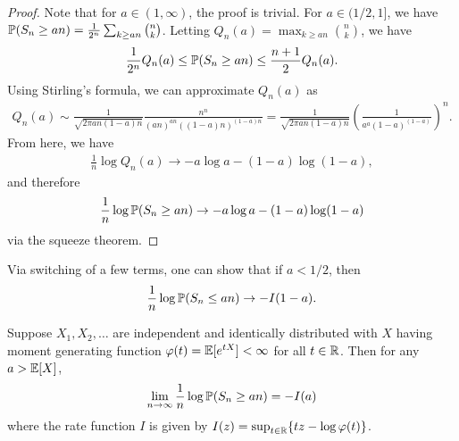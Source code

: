 \begin{proof}
    Note that for $a \in (1,\infty)$, the proof is trivial. For $a \in (1/2,1]$, we have $\mathbb{P}(S_{n} \geq an) = \frac{1}{2^{n}} \sum_{k \geq an} \binom{n}{k}$. Letting $Q_{n}(a) = \max_{k \geq an} \binom{n}{k}$, we have
    \begin{align}
        \frac{1}{2^{n}} Q_{n}(a) \leq \mathbb{P}(S_{n} \geq an) \leq \frac{n+1}{2} Q_{n}(a).
    \end{align}
    Using Stirling's formula, we can approximate $Q_{n}(a)$ as
    \begin{align}
        Q_{n}(a) \sim \frac{1}{\sqrt{2\pi an(1-a)n}} \frac{n^{n}}{(an)^{an}((1-a)n)^{(1-a)n}} = \frac{1}{\sqrt{2\pi an(1-a)n}} \left(\frac{1}{a^{a}(1-a)^{(1-a)}}\right)^{n}.
    \end{align}
    From here, we have
    \begin{align}
        \frac{1}{n} \log Q_{n}(a) \to -a\log a - (1-a)\log(1-a),
    \end{align}
    and therefore
    \begin{align}
        \frac{1}{n} \log \mathbb{P}(S_{n} \geq an) \to -a\log a - (1-a)\log(1-a)
    \end{align}
    via the squeeze theorem.
\end{proof}

\begin{remark}
    Via switching of a few terms, one can show that if $a < 1/2$, then
    \begin{align}
        \frac{1}{n} \log \mathbb{P}(S_{n} \leq an) \to -I(1-a).
    \end{align}
\end{remark}

\begin{theorem}
    Suppose $X_{1},X_{2},\ldots$ are independent and identically distributed with $X$ having moment generating function $\varphi(t) = \mathbb{E}[e^{tX}] < \infty$ for all $t \in \mathbb{R}$. Then for any $a > \mathbb{E}[X]$,
    \begin{align}
        \lim_{n \to \infty} \frac{1}{n} \log \mathbb{P}(S_{n} \geq an) = -I(a)
    \end{align}
    where the rate function $I$ is given by $I(z) = \sup_{t \in \mathbb{R}}\{tz - \log \varphi(t)\}$.
\end{theorem}

